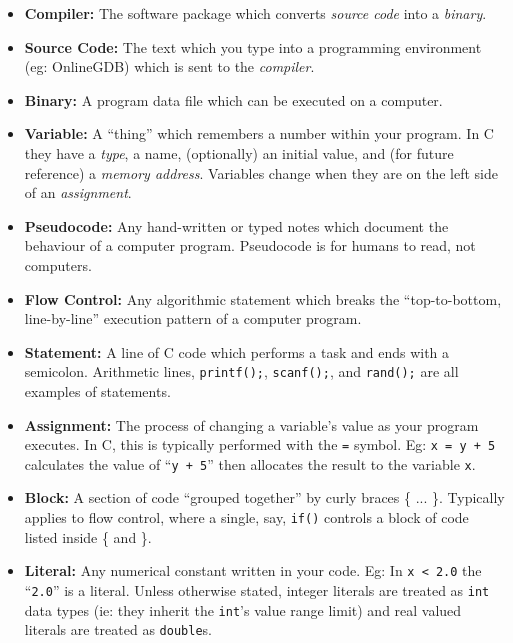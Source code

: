 \documentclass{lab}
\begin{document}
\begin{multicols}{2}
\begin{itemize}
\item \textbf{Compiler:} The software package which converts \textit{source code} into a \textit{binary}.
\item \textbf{Source Code:} The text which you type into a programming environment (eg: OnlineGDB) which is sent to the \textit{compiler}.
\item \textbf{Binary:} A program data file which can be executed on a computer.
\item \textbf{Variable:} A ``thing'' which remembers a number within your program. In C they have a \textit{type}, a name, (optionally) an initial value, and (for future reference) a \textit{memory address}. Variables change when they are on the left side of an \textit{assignment}.
\item \textbf{Pseudocode:} Any hand-written or typed notes which document the behaviour of a computer program. Pseudocode is for humans to read, not computers.
\item \textbf{Flow Control:} Any algorithmic statement which breaks the ``top-to-bottom, line-by-line'' execution pattern of a computer program.
\columnbreak
\item \textbf{Statement:} A line of C code which performs a task and ends with a semicolon. Arithmetic lines, \texttt{printf();}, \texttt{scanf();}, and \texttt{rand();} are all examples of statements.
\item \textbf{Assignment:} The process of changing a variable's value as your program executes. In C, this is typically performed with the \texttt{=} symbol. Eg: \texttt{x = y + 5} calculates the value of ``\texttt{y + 5}'' then allocates the result to the variable \texttt{x}.
\item \textbf{Block:} A section of code ``grouped together'' by curly braces \{ ... \}. Typically applies to flow control, where a single, say, \texttt{if()} controls a block of code listed inside \{ and \}.
\item \textbf{Literal:} Any numerical constant written in your code. Eg: In \texttt{x < 2.0} the ``\texttt{2.0}'' is a literal. Unless otherwise stated, integer literals are treated as \texttt{int} data types (ie: they inherit the \texttt{int}'s value range limit) and real valued literals are treated as \texttt{double}s.
\end{itemize}

\end{multicols}
\end{document}
